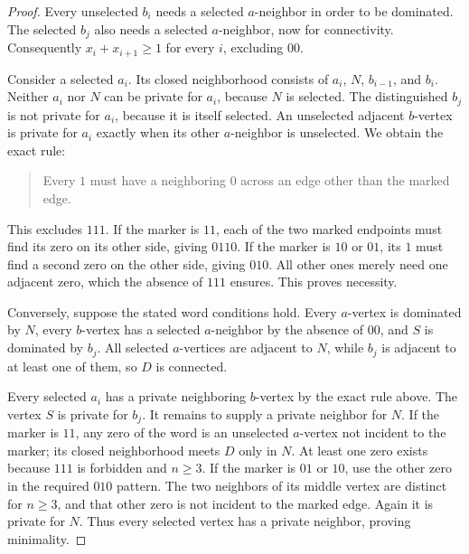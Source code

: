 \documentclass[11pt,letterpaper]{article}
\numberwithin{equation}{section}
\theoremstyle{definition}
\newcommand{\1}{\mathbf 1}
\begin{document}
\begin{proof}
Every unselected $b_i$ needs a selected $a$-neighbor in order to be dominated.
The selected $b_j$ also needs a selected $a$-neighbor, now for connectivity.
Consequently $x_i+x_{i+1}\ge1$ for every $i$, excluding $00$.

Consider a selected $a_i$. Its closed neighborhood consists of $a_i$, $N$,
$b_{i-1}$, and $b_i$. Neither $a_i$ nor $N$ can be private for $a_i$, because
$N$ is selected. The distinguished $b_j$ is not private for $a_i$, because it
is itself selected. An unselected adjacent $b$-vertex is private for $a_i$
exactly when its other $a$-neighbor is unselected. We obtain the exact rule:
\begin{quote}
Every $1$ must have a neighboring $0$ across an edge other than the marked edge.
\end{quote}
This excludes $111$. If the marker is $11$, each of the two marked endpoints
must find its zero on its other side, giving $0110$. If the marker is $10$ or
$01$, its $1$ must find a second zero on the other side, giving $010$. All other
ones merely need one adjacent zero, which the absence of $111$ ensures.
This proves necessity.

Conversely, suppose the stated word conditions hold. Every $a$-vertex is
dominated by $N$, every $b$-vertex has a selected $a$-neighbor by the absence
of $00$, and $S$ is dominated by $b_j$. All selected $a$-vertices are adjacent
to $N$, while $b_j$ is adjacent to at least one of them, so $D$ is connected.

Every selected $a_i$ has a private neighboring $b$-vertex by the exact rule
above. The vertex $S$ is private for $b_j$. It remains to supply a private
neighbor for $N$. If the marker is $11$, any zero of the word is an unselected
$a$-vertex not incident to the marker; its closed neighborhood meets $D$ only
in $N$. At least one zero exists because $111$ is forbidden and $n\ge3$.
If the marker is $01$ or $10$, use the other zero in the required $010$ pattern.
The two neighbors of its middle vertex are distinct for $n\ge3$, and that
other zero is not incident to the marked edge. Again it is private for $N$.
Thus every selected vertex has a private neighbor, proving minimality.
\end{proof}
\end{document}
